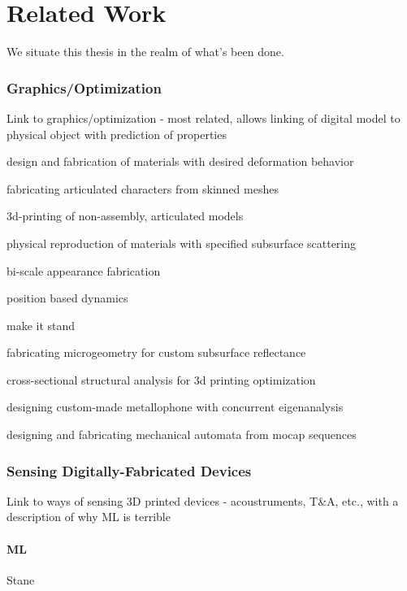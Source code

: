 \chapter{Related Work}

We situate this thesis in the realm of what's been done.

\subsection{Graphics/Optimization}
Link to graphics/optimization - most related, allows linking of digital model to physical object with prediction of properties

\cite{bickel-deformation} design and fabrication of materials with desired deformation behavior

\cite{bacher-posable} fabricating articulated characters from skinned meshes

\cite{cali-articulated} 3d-printing of non-assembly, articulated models

\cite{hasan-subsurface} physical reproduction of materials with specified subsurface scattering

\cite{lan-appearance} bi-scale appearance fabrication

\cite{muller-pbd} position based dynamics

\cite{prevost-makeitstand} make it stand

\cite{weyrich-reflectance} fabricating microgeometry for custom subsurface reflectance

\cite{umetani-strength} cross-sectional structural analysis for 3d printing optimization

\cite{umetani-metallophone} designing custom-made metallophone with concurrent eigenanalysis

\cite{ceylan-automata} designing and fabricating mechanical automata from mocap sequences

\subsection{Sensing Digitally-Fabricated Devices}
Link to ways of sensing 3D printed devices - acoustruments, T\&A, etc., with a description of why ML is terrible

\subsubsection{ML}

\cite{murray-smith-stane} Stane

